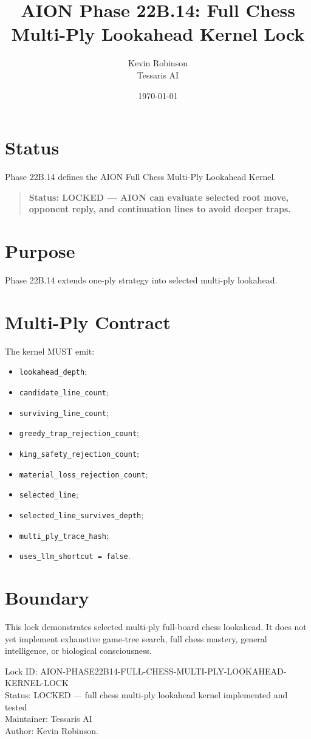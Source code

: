 \documentclass[11pt,a4paper]{article}
\title{\textbf{AION Phase 22B.14: Full Chess Multi-Ply Lookahead Kernel Lock}}
\author{Kevin Robinson\\Tessaris AI}
\date{\today}
\begin{document}
\maketitle

\section{Status}

Phase 22B.14 defines the AION Full Chess Multi-Ply Lookahead Kernel.

\begin{quote}
\textbf{Status: LOCKED --- AION can evaluate selected root move, opponent reply, and continuation lines to avoid deeper traps.}
\end{quote}

\section{Purpose}

Phase 22B.14 extends one-ply strategy into selected multi-ply lookahead.

\section{Multi-Ply Contract}

The kernel MUST emit:

\begin{itemize}
  \item \texttt{lookahead\_depth};
  \item \texttt{candidate\_line\_count};
  \item \texttt{surviving\_line\_count};
  \item \texttt{greedy\_trap\_rejection\_count};
  \item \texttt{king\_safety\_rejection\_count};
  \item \texttt{material\_loss\_rejection\_count};
  \item \texttt{selected\_line};
  \item \texttt{selected\_line\_survives\_depth};
  \item \texttt{multi\_ply\_trace\_hash};
  \item \texttt{uses\_llm\_shortcut = false}.
\end{itemize}

\section{Boundary}

This lock demonstrates selected multi-ply full-board chess lookahead. It does not yet implement exhaustive game-tree search, full chess mastery, general intelligence, or biological consciousness.

\bigskip

\noindent
Lock ID: AION-PHASE22B14-FULL-CHESS-MULTI-PLY-LOOKAHEAD-KERNEL-LOCK\\
Status: LOCKED --- full chess multi-ply lookahead kernel implemented and tested\\
Maintainer: Tessaris AI\\
Author: Kevin Robinson.
\end{document}
